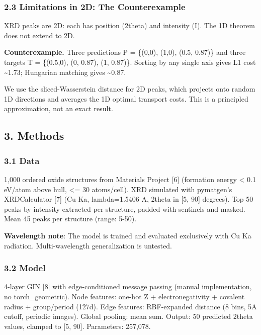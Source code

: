 \documentclass[
  11pt,
]{article}
\begin{document}
\subsubsection{2.3 Limitations in 2D: The
Counterexample}\label{limitations-in-2d-the-counterexample}

XRD peaks are 2D: each has position (2theta) and intensity (I). The 1D
theorem does not extend to 2D.

\textbf{Counterexample.} Three predictions P = \{(0,0), (1,0), (0.5,
0.87)\} and three targets T = \{(0.5,0), (0, 0.87), (1, 0.87)\}. Sorting
by any single axis gives L1 cost \textasciitilde1.73; Hungarian matching
gives \textasciitilde0.87.

We use the sliced-Wasserstein distance for 2D peaks, which projects onto
random 1D directions and averages the 1D optimal transport costs. This
is a principled approximation, not an exact result.

\subsection{3. Methods}\label{methods}

\subsubsection{3.1 Data}\label{data}

1,000 ordered oxide structures from Materials Project {[}6{]} (formation
energy \textless{} 0.1 eV/atom above hull, \textless= 30 atoms/cell).
XRD simulated with pymatgen's XRDCalculator {[}7{]} (Cu Ka,
lambda=1.5406 A, 2theta in {[}5, 90{]} degrees). Top 50 peaks by
intensity extracted per structure, padded with sentinels and masked.
Mean 45 peaks per structure (range: 5-50).

\textbf{Wavelength note}: The model is trained and evaluated exclusively
with Cu Ka radiation. Multi-wavelength generalization is untested.

\subsubsection{3.2 Model}\label{model}

4-layer GIN {[}8{]} with edge-conditioned message passing (manual
implementation, no torch\_geometric). Node features: one-hot Z +
electronegativity + covalent radius + group/period (127d). Edge
features: RBF-expanded distance (8 bins, 5A cutoff, periodic images).
Global pooling: mean \textbar\textbar{} sum. Output: 50 predicted 2theta
values, clamped to {[}5, 90{]}. Parameters: 257,078.
\end{document}
